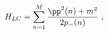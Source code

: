 \begin{equation}
\label{eq:M particle Hamiltonian 2}
     H_{LC} = \sum_{n=1}^M
     \frac{\pp^2 (n) + m^2}{2 p_- (n)} \ ,
\end{equation}

